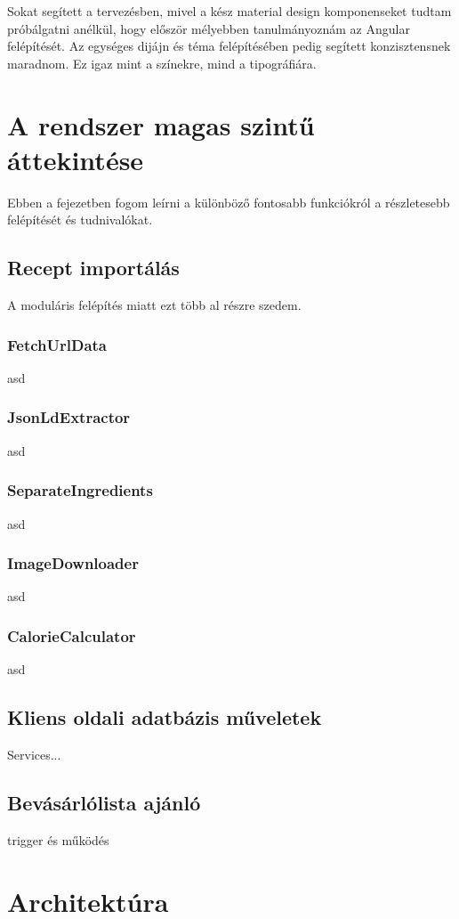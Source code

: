 \documentclass[12pt]{report}
\theoremstyle{definition}
\begin{document}
Sokat segített a tervezésben, mivel a kész material design komponenseket tudtam próbálgatni anélkül, hogy először mélyebben tanulmányoznám az Angular felépítését. Az egységes dijájn és téma felépítésében pedig segített konzisztensnek maradnom. Ez igaz mint a színekre, mind a tipográfiára.


\chapter{A rendszer magas szintű áttekintése}
Ebben a fejezetben fogom leírni a különböző fontosabb funkciókról a részletesebb felépítését és tudnivalókat.

\section{Recept importálás}
A moduláris felépítés miatt ezt több al részre szedem.

\subsection{FetchUrlData}
asd
\subsection{JsonLdExtractor}
asd
\subsection{SeparateIngredients}
asd
\subsection{ImageDownloader} 
asd
\subsection{CalorieCalculator}
asd
\section{Kliens oldali adatbázis műveletek}
Services...

\section{Bevásárlólista ajánló}
trigger és működés


\chapter{Architektúra}
\end{document}
